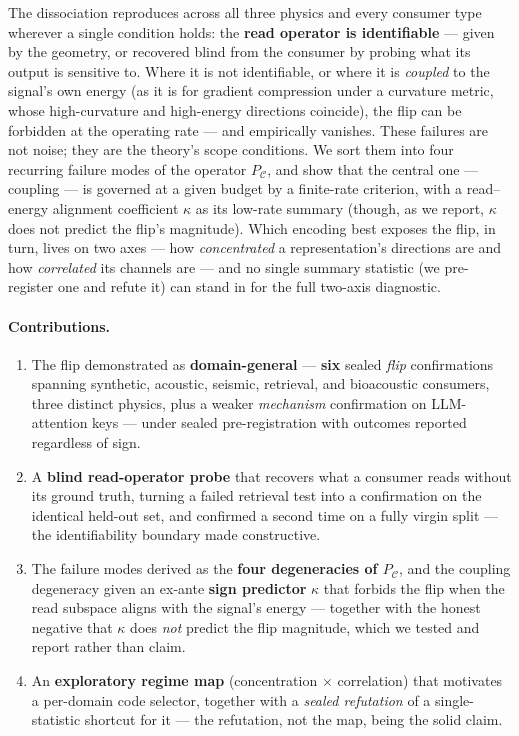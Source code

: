 \documentclass[10pt]{article} %
\theoremstyle{remark}
\newcommand{\PC}{P_{\mathcal{C}}}
\newcommand{\kalign}{\kappa}
\begin{document}
The dissociation reproduces across all three physics and every consumer type wherever a
single condition holds: the \textbf{read operator is identifiable} --- given by the
geometry, or recovered blind from the consumer by probing what its output is sensitive
to. Where it is not identifiable, or where it is \emph{coupled} to the signal's own
energy (as it is for gradient compression under a curvature metric, whose high-curvature
and high-energy directions coincide), the flip can be forbidden at the operating rate ---
and empirically vanishes. These failures are not noise; they are the theory's scope conditions. We sort them
into four recurring failure modes of the operator $\PC$, and show that the central one
--- coupling --- is governed at a given budget by a finite-rate criterion, with a
read--energy alignment coefficient $\kalign$ as its low-rate summary (though, as we report,
$\kalign$ does not predict the flip's magnitude). Which encoding best exposes the flip, in turn, lives on two
axes --- how \emph{concentrated} a representation's directions are and how
\emph{correlated} its channels are --- and no single summary statistic (we pre-register
one and refute it) can stand in for the full two-axis diagnostic.

\paragraph{Contributions.}
\begin{enumerate}\itemsep2pt
\item The flip demonstrated as \textbf{domain-general} --- \textbf{six} sealed \emph{flip}
confirmations spanning synthetic, acoustic, seismic, retrieval, and bioacoustic consumers,
three distinct physics, plus a weaker \emph{mechanism} confirmation on LLM-attention keys
--- under sealed pre-registration with outcomes reported regardless of sign.
\item A \textbf{blind read-operator probe} that recovers what a consumer reads without
its ground truth, turning a failed retrieval test into a confirmation on the identical
held-out set, and confirmed a second time on a fully virgin split --- the identifiability
boundary made constructive.
\item The failure modes derived as the \textbf{four degeneracies of $\PC$}, and the
coupling degeneracy given an ex-ante \textbf{sign predictor} $\kalign$ that forbids the
flip when the read subspace aligns with the signal's energy --- together with the honest
negative that $\kalign$ does \emph{not} predict the flip magnitude, which we tested and
report rather than claim.
\item An \textbf{exploratory regime map} (concentration $\times$ correlation) that motivates
a per-domain code selector, together with a \emph{sealed refutation} of a single-statistic
shortcut for it --- the refutation, not the map, being the solid claim.
\end{enumerate}
\end{document}
